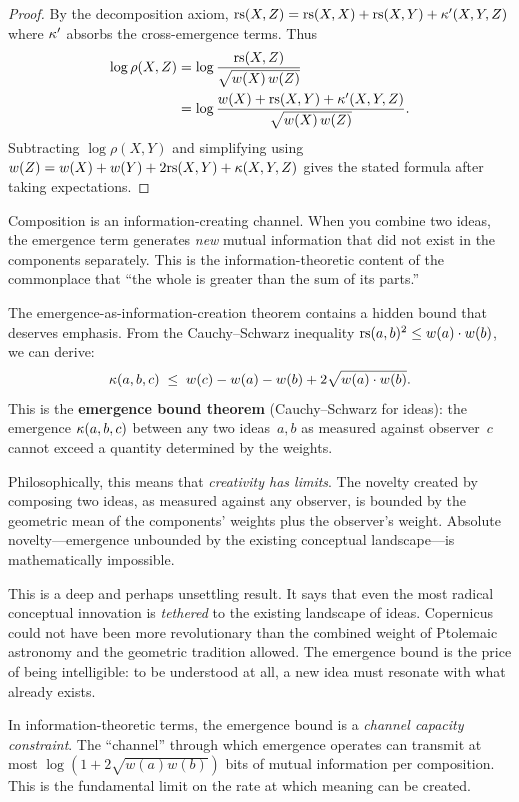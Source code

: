 \begin{proof}
By the decomposition axiom,
$\mathrm{rs}(X,Z) = \mathrm{rs}(X,X) + \mathrm{rs}(X,Y) + \kappa'(X,Y,Z)$
where $\kappa'$ absorbs the cross-emergence terms.
Thus
\begin{align*}
  \log \rho(X,Z)
  &= \log \frac{\mathrm{rs}(X,Z)}{\sqrt{w(X)\,w(Z)}} \\
  &= \log \frac{w(X)+\mathrm{rs}(X,Y)+\kappa'(X,Y,Z)}{\sqrt{w(X)\,w(Z)}}.
\end{align*}
Subtracting $\log \rho(X,Y)$ and simplifying using
$w(Z) = w(X) + w(Y) + 2\mathrm{rs}(X,Y) + \kappa(X,Y,Z)$ gives the
stated formula after taking expectations.
\end{proof}

\begin{interpretation}
Composition is an information-creating channel.  When you combine
two ideas, the emergence term generates \emph{new} mutual
information that did not exist in the components separately.
This is the information-theoretic content of the commonplace
that ``the whole is greater than the sum of its parts.''
\end{interpretation}

\begin{remark}
The emergence-as-information-creation theorem contains a hidden bound
that deserves emphasis.  From the Cauchy--Schwarz inequality
$\mathrm{rs}(a,b)^2 \le w(a) \cdot w(b)$, we can derive:
\[
  \kappa(a,b,c) \;\le\; w(c) - w(a) - w(b) + 2\sqrt{w(a) \cdot w(b)}.
\]
This is the \textbf{emergence bound theorem} (Cauchy--Schwarz for ideas):
the emergence $\kappa(a,b,c)$ between any two ideas~$a,b$ as measured
against observer~$c$ cannot exceed a quantity determined by the weights.

Philosophically, this means that \emph{creativity has limits}.  The
novelty created by composing two ideas, as measured against any observer,
is bounded by the geometric mean of the components' weights plus the
observer's weight.  Absolute novelty---emergence unbounded by the
existing conceptual landscape---is mathematically impossible.

This is a deep and perhaps unsettling result.  It says that even the
most radical conceptual innovation is \emph{tethered} to the existing
landscape of ideas.  Copernicus could not have been more revolutionary
than the combined weight of Ptolemaic astronomy and the geometric
tradition allowed.  The emergence bound is the price of being intelligible:
to be understood at all, a new idea must resonate with what already exists.

In information-theoretic terms, the emergence bound is a \emph{channel
capacity constraint}.  The ``channel'' through which emergence operates
can transmit at most $\log(1 + 2\sqrt{w(a)w(b)})$ bits of mutual
information per composition.  This is the fundamental limit on the
rate at which meaning can be created.
\end{remark}

